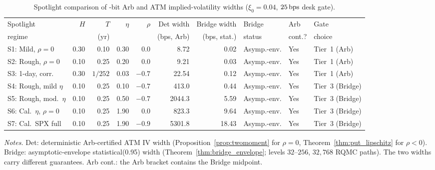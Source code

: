 \begin{table}[t]
\centering
\caption{Spotlight comparison of \ArbBits-bit Arb \RCDet{} and \RCBridge{} ATM implied-volatility widths ($\xi_0=0.04$, $25\,\mathrm{bps}$ desk gate).}
\label{tab:e2_spotlights}
\footnotesize
\setlength{\tabcolsep}{3.6pt}
\begin{tabular}{@{}lrrrrrrlll@{}}
\toprule
Spotlight & $H$ & $T$ & $\eta$ & $\rho$ & Det width & Bridge width & Bridge & Arb & Gate \\
regime & & (yr) & & & (bps, Arb) & (bps, stat.) & status & cont.? & choice \\
\midrule
S1: Mild, $\rho=0$ & 0.30 & 0.10 & 0.30 & $0.0$ & 8.72 & 0.02 & Asymp.-env. & Yes & Tier~1 (Arb) \\
S2: Rough, $\rho=0$ & 0.10 & 0.25 & 0.20 & $0.0$ & 9.21 & 0.03 & Asymp.-env. & Yes & Tier~1 (Arb) \\
S3: 1-day, corr. & 0.30 & $1/252$ & 0.03 & $-0.7$ & 22.54 & 0.12 & Asymp.-env. & Yes & Tier~1 (Arb) \\
S4: Rough, mild $\eta$ & 0.10 & 0.25 & 0.10 & $-0.7$ & 413.0 & 0.44 & Asymp.-env. & Yes & Tier~3 (Bridge) \\
S5: Rough, mod.\ $\eta$ & 0.10 & 0.25 & 0.50 & $-0.7$ & 2044.3 & 5.59 & Asymp.-env. & Yes & Tier~3 (Bridge) \\
S6: Cal.\ $\eta$, $\rho=0$ & 0.10 & 0.25 & 1.90 & $0.0$ & 823.3 & 9.64 & Asymp.-env. & Yes & Tier~3 (Bridge) \\
S7: Cal.\ SPX full & 0.10 & 0.25 & 1.90 & $-0.9$ & 5301.8 & 18.43 & Asymp.-env. & Yes & Tier~3 (Bridge) \\
\bottomrule
\end{tabular}
\par\smallskip
\parbox{\linewidth}{\footnotesize\emph{Notes.} Det: deterministic Arb-certified ATM IV width (Proposition~\ref{prop:twomoment} for $\rho=0$, Theorem~\ref{thm:put_lipschitz} for $\rho<0$). Bridge: asymptotic-envelope statistical(0.95) width (Theorem~\ref{thm:bridge_envelope}; levels $32$--$256$, $32{,}768$ RQMC paths). The two widths carry different guarantees. Arb cont.: the Arb bracket contains the Bridge midpoint.}
\end{table}
